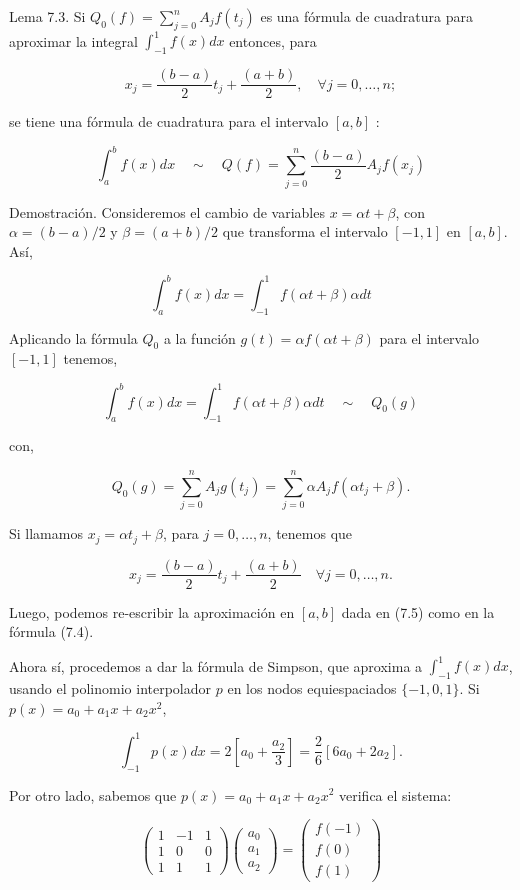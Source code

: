 \documentclass[10pt]{book}
\begin{document}
Lema 7.3. Si $Q_{0}(f)=\sum_{j=0}^{n} A_{j} f\left(t_{j}\right)$ es una fórmula de cuadratura para aproximar la integral $\int_{-1}^{1} f(x) d x$ entonces, para

$$
x_{j}=\frac{(b-a)}{2} t_{j}+\frac{(a+b)}{2}, \quad \forall j=0, \ldots, n ;
$$

se tiene una fórmula de cuadratura para el intervalo $[a, b]$ :


\begin{equation*}
\int_{a}^{b} f(x) d x \quad \sim \quad Q(f)=\sum_{j=0}^{n} \frac{(b-a)}{2} A_{j} f\left(x_{j}\right) \tag{7.4}
\end{equation*}


Demostración. Consideremos el cambio de variables $x=\alpha t+\beta$, con $\alpha=(b-a) / 2$ y $\beta=(a+b) / 2$ que transforma el intervalo $[-1,1]$ en $[a, b]$. Así,

$$
\int_{a}^{b} f(x) d x=\int_{-1}^{1} f(\alpha t+\beta) \alpha d t
$$

Aplicando la fórmula $Q_{0}$ a la función $g(t)=\alpha f(\alpha t+\beta)$ para el intervalo $[-1,1]$ tenemos,


\begin{equation*}
\int_{a}^{b} f(x) d x=\int_{-1}^{1} f(\alpha t+\beta) \alpha d t \quad \sim \quad Q_{0}(g) \tag{7.5}
\end{equation*}


con,

$$
Q_{0}(g)=\sum_{j=0}^{n} A_{j} g\left(t_{j}\right)=\sum_{j=0}^{n} \alpha A_{j} f\left(\alpha t_{j}+\beta\right) .
$$

Si llamamos $x_{j}=\alpha t_{j}+\beta$, para $j=0, \ldots, n$, tenemos que

$$
x_{j}=\frac{(b-a)}{2} t_{j}+\frac{(a+b)}{2} \quad \forall j=0, \ldots, n .
$$

Luego, podemos re-escribir la aproximación en $[a, b]$ dada en (7.5) como en la fórmula (7.4).

Ahora sí, procedemos a dar la fórmula de Simpson, que aproxima a $\int_{-1}^{1} f(x) d x$, usando el polinomio interpolador $p$ en los nodos equiespaciados $\{-1,0,1\}$. Si $p(x)=a_{0}+a_{1} x+a_{2} x^{2}$,

$$
\int_{-1}^{1} p(x) d x=2\left[a_{0}+\frac{a_{2}}{3}\right]=\frac{2}{6}\left[6 a_{0}+2 a_{2}\right] .
$$

Por otro lado, sabemos que $p(x)=a_{0}+a_{1} x+a_{2} x^{2}$ verifica el sistema:

$$
\left(\begin{array}{ccc}
1 & -1 & 1 \\
1 & 0 & 0 \\
1 & 1 & 1
\end{array}\right)\left(\begin{array}{l}
a_{0} \\
a_{1} \\
a_{2}
\end{array}\right)=\left(\begin{array}{c}
f(-1) \\
f(0) \\
f(1)
\end{array}\right)
$$
\end{document}
